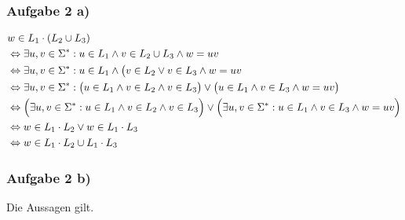 \subsubsection{Aufgabe 2 a)}
\begin{align*}
	&w\in L_1\cdot(L_2\cup L_3)\\
	&\Leftrightarrow\exists u,v\in\Sigma^\ast:u\in L_1\wedge v\in L_2\cup L_3\wedge w=uv\\
	&\Leftrightarrow\exists u,v\in\Sigma^\ast:u\in L_1\wedge \big(v\in L_2\vee v\in L_3\wedge w=uv\\
	&\Leftrightarrow\exists u,v\in\Sigma^\ast:\big(u\in L_1\wedge v\in L_2\wedge v\in L_3\big)\vee\big(u\in L_1\wedge v\in L_3\wedge w=uv\big)\\
	&\Leftrightarrow\Big(\exists u,v\in\Sigma^\ast:u\in L_1\wedge v\in L_2\wedge v\in L_3\Big)\vee
	\Big(\exists u,v\in\Sigma^\ast:u\in L_1\wedge v\in L_3\wedge w=uv\Big)\\
	&\Leftrightarrow w\in L_1\cdot L_2\vee w\in L_1\cdot L_3\\
	&\Leftrightarrow w\in L_1\cdot L_2\cup L_1\cdot L_3
\end{align*}

\subsubsection{Aufgabe 2 b)}
Die Aussagen gilt.

